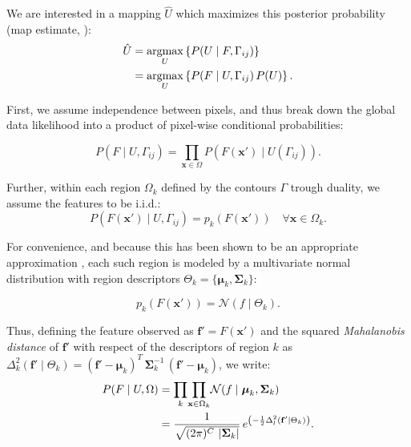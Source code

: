 We are interested in a mapping $\hat{U}$ which maximizes this
posterior probability (\gls*{map} estimate, \citep{bishop_pattern_2006}):
\begin{align}
\hat{U} &= \underset{U}{\argmax} \left\{ P(U \mid F,\Gamma_{ij}) \right\} \notag\\
 &= \underset{U}{\argmax} \left\{ P(F \mid U,\Gamma_{ij})\, P(U) \right\}.
\label{eq:map_u}
\end{align}

First, we assume independence between pixels, and thus break down the
global data likelihood into a product of pixel-wise conditional probabilities:

\begin{equation}
P(F \mid U,\Gamma_{ij}) = 
\underset{\mathbf{x}\in \Omega}{\prod} P\left( F(\mathbf{x}') \mid U(\Gamma_{ij}) \right).
\label{eq:bayes_aposteriori}
\end{equation}

Further, within each region $\Omega_k$ defined by the contours $\Gamma$
trough duality, we assume the features to be i.i.d.:
\begin{equation}
P\left( F(\mathbf{x}') \mid U,\Gamma_{ij} \right) = p_k( F(\mathbf{x}')) \quad
\forall \mathbf{x} \in \Omega_k.
\label{eq:likelihood}
\end{equation}

For convenience, and because this has been shown to be an appropriate
approximation \citep{bishop_pattern_2006}, each such region is modeled
by a multivariate normal distribution with region descriptors
$\Theta_k = \lbrace \boldsymbol{\mu}_k, \boldsymbol{\Sigma}_{k} \rbrace$:

\begin{equation}
p_k( F(\mathbf{x}') ) = \mathcal{N} ( f \mid \Theta_k ).
\label{eq:multivariate_normal}
\end{equation}

Thus, defining the feature observed as $\mathbf{f}'=F(\mathbf{x}')$ and 
the squared \emph{Mahalanobis distance} of $\mathbf{f}'$ with respect
of the descriptors of region $k$ as
$\Delta^2_k (\mathbf{f}' \mid \Theta_k ) = (\mathbf{f}' - \boldsymbol{\mu}_k)^T \, \boldsymbol{\Sigma}^{-1}_k \, (\mathbf{f}' - \boldsymbol{\mu}_k)$,
we write:
\begin{align}
P( F \mid U, \Omega ) &= \underset{k}{\prod} \underset{\mathbf{x} \in \Omega_k}{\prod}
\mathcal{N} ( f \mid \boldsymbol{\mu}_k, \boldsymbol{\Sigma}_{k} ) \notag\\
&= \frac{1}{ \sqrt{(2\pi)^{C}\,\left|\boldsymbol{\Sigma}_{k}\right|}}\,{e^{\left(-\frac{1}{2}  \Delta^2_l (\mathbf{f}' \mid \Theta_k ) \right)}}.
\label{eq:pdf}
\end{align}

